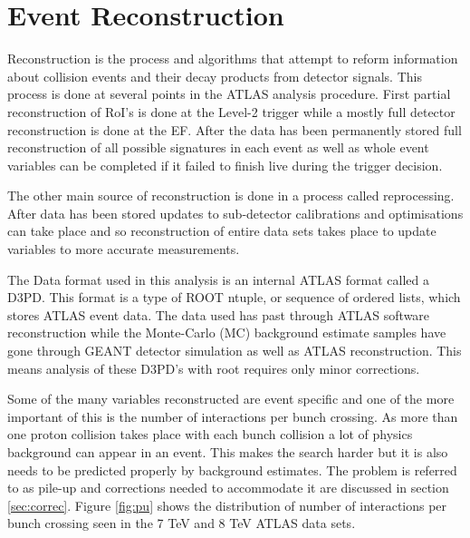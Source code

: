 \chapter{Event Reconstruction}

Reconstruction is the process and algorithms that attempt to reform information about collision events and their decay products from detector signals. This process is done at several points in the ATLAS analysis procedure. First partial reconstruction of RoI's is done at the Level-2 trigger while a mostly full detector reconstruction is done at the EF. After the data has been permanently stored full reconstruction of all possible signatures in each event as well as whole event variables can be completed if it failed to finish live during the trigger decision.

The other main source of reconstruction is done in a process called reprocessing. After data has been stored updates to sub-detector calibrations and optimisations can take place and so reconstruction of entire data sets takes place to update variables to more accurate measurements. 

The Data format used in this analysis is an internal ATLAS format called a D3PD. This format is a type of ROOT \cite{} ntuple, or sequence of ordered lists, which stores ATLAS event data. The data used has past through ATLAS software reconstruction while the Monte-Carlo (MC) background estimate samples have gone through GEANT \cite{} detector simulation as well as ATLAS reconstruction. This means analysis of these D3PD's with root requires only minor corrections.


Some of the many variables reconstructed are event specific and one of the more important of this is the number of interactions per bunch crossing. As more than one proton collision takes place with each bunch collision a lot of physics background can appear in an event. This makes the search harder but it is also needs to be predicted properly by background estimates. The problem is referred to as pile-up and corrections needed to accommodate it are discussed in section \ref{sec:correc}. Figure \ref{fig:pu} shows the distribution of number of interactions per bunch crossing seen in the 7 TeV and 8 TeV ATLAS data sets.

